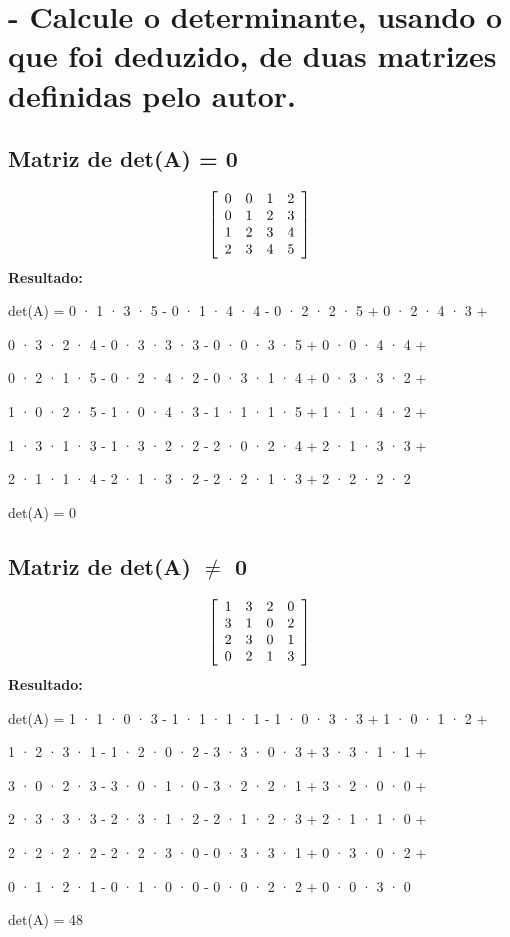 \documentclass[a4paper, 12pt]{article}
\begin{document}
\section{- Calcule o determinante, usando o que foi deduzido, de duas matrizes definidas pelo autor.}

\subsection{Matriz de det(A) = 0}
$$\left[
\begin{array}{c c c c}
0&0&1&2\\
0&1&2&3\\
1&2&3&4\\ 2&3&4&5
\end{array}\right]
$$
\textbf{Resultado:}

\centerline{det(A) = 0 · 1 · 3 · 5 - 0 · 1 · 4 · 4 - 0 · 2 · 2 · 5 + 0 · 2 · 4 · 3 +}
\centerline{0 · 3 · 2 · 4 - 0 · 3 · 3 · 3 - 0 · 0 · 3 · 5 + 0 · 0 · 4 · 4 +}
\centerline{0 · 2 · 1 · 5 - 0 · 2 · 4 · 2 - 0 · 3 · 1 · 4 + 0 · 3 · 3 · 2 +}
\centerline{1 · 0 · 2 · 5 - 1 · 0 · 4 · 3 - 1 · 1 · 1 · 5 + 1 · 1 · 4 · 2 +}
\centerline{1 · 3 · 1 · 3 - 1 · 3 · 2 · 2 - 2 · 0 · 2 · 4 + 2 · 1 · 3 · 3 +}
\centerline{2 · 1 · 1 · 4 - 2 · 1 · 3 · 2 - 2 · 2 · 1 · 3 + 2 · 2 · 2 · 2}\vspace{1cm}

\centerline{det(A) = 0}


\subsection{Matriz de det(A) $\neq$ 0}
$$\left[
\begin{array}{c c c c}
1&3&2&0\\
3&1&0&2\\
2&3&0&1\\ 0&2&1&3
\end{array}\right]
$$
\textbf{Resultado:}

\centerline{det(A) = 1 · 1 · 0 · 3 - 1 · 1 · 1 · 1 - 1 · 0 · 3 · 3 + 1 · 0 · 1 · 2 +}
\centerline{1 · 2 · 3 · 1 - 1 · 2 · 0 · 2 - 3 · 3 · 0 · 3 + 3 · 3 · 1 · 1 +}
\centerline{3 · 0 · 2 · 3 - 3 · 0 · 1 · 0 - 3 · 2 · 2 · 1 + 3 · 2 · 0 · 0 +}
\centerline{2 · 3 · 3 · 3 - 2 · 3 · 1 · 2 - 2 · 1 · 2 · 3 + 2 · 1 · 1 · 0 +}
\centerline{2 · 2 · 2 · 2 - 2 · 2 · 3 · 0 - 0 · 3 · 3 · 1 + 0 · 3 · 0 · 2 +}
\centerline{0 · 1 · 2 · 1 - 0 · 1 · 0 · 0 - 0 · 0 · 2 · 2 + 0 · 0 · 3 · 0}\vspace{1cm}

\centerline{det(A) = 48}
\end{document}
